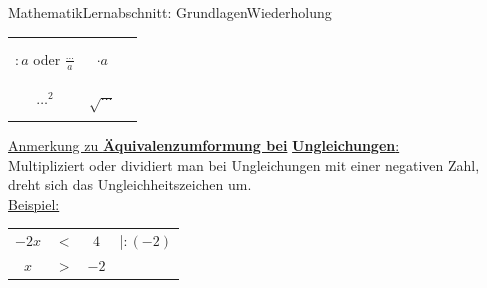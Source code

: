 \documentclass[11pt,twocolumn,oneside,openany,headings=optiontotoc,11pt,numbers=noenddot]{article}
\begin{document}
\begin{worksheet}{Mathematik}{Lernabschnitt: Grundlagen}{Wiederholung}
\begin{tabularx}{0.45\textwidth}{|c|c|X|}
			\multicolumn{1}{|l|}{} & & \\
			\cline{1-2}
			\multicolumn{1}{|l|}{} & & \\
			\(:a\) oder \(\frac{\ldots}{a}\) & \(\cdot{}a\) & \\
			\multicolumn{1}{|l|}{} & & \\
			\cline{1-2}
			\multicolumn{1}{|l|}{} & & \\
			\(\ldots^2\) & \glqq{}\(\sqrt{\ldots}\)\grqq{} & \\
			\multicolumn{1}{|l|}{} & & \\
			\hline
		\end{tabularx}
		\par\bigskip\noindent
		\underline{Anmerkung zu \textbf{Äquivalenzumformung bei}} \underline{\textbf{Ungleichungen}:}\\
		Multipliziert oder dividiert man bei Ungleichungen mit einer negativen Zahl, dreht sich das Ungleichheitszeichen um.\\
		\underline{Beispiel:}
		\begin{tabularx}{0.5\textwidth}{cccl}
			\(-2x\) & \(<\) & \(4\) & |\(:(-2)\)\\
			\(x\) & \(>\) & \(-2\)
		\end{tabularx}
	\end{worksheet}
\end{document}
